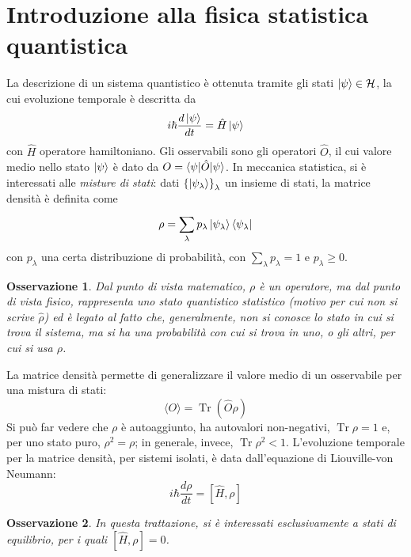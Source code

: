 \documentclass[11pt, a4paper]{scrartcl}
\theoremstyle{style}
\newtheorem{osservazione}{Osservazione}[section]
\theoremstyle{style1}
\numberwithin{equation}{subsection}
\begin{document}
\newpage

\section{Introduzione alla fisica statistica quantistica}
La descrizione di un sistema quantistico \`e ottenuta tramite gli stati $\ket{\psi } \in \mathcal{H} $, la cui evoluzione temporale \`e descritta da 
\[
i \hbar \frac{ d\ket{\psi } }{d t} = \hat{H} \ket{\psi } 
\] 
con $\hat{H}$ operatore hamiltoniano.
Gli osservabili sono gli operatori $\hat{O}$, il cui valore medio nello stato $\ket{\psi } $ \`e dato da $O = \braket{\psi |\hat{O}|\psi } $.
In meccanica statistica, si \`e interessati alle \textit{misture di stati}: dati $\left\{ \ket{\psi _\lambda }  \right\} _\lambda $ un insieme di stati, la matrice densit\`a \`e definita come
\[
\rho  = \sum_{\lambda }^{} p_\lambda \ket{\psi _\lambda } \bra{\psi _\lambda }  
\] 
con $p_\lambda $ una certa distribuzione di probabilit\`a, con $\sum_{\lambda }^{} p_\lambda  = 1$ e $p_\lambda  \ge  0$.
\begin{osservazione}
Dal punto di vista matematico, $\rho $ \`e un operatore, ma dal punto di vista fisico, rappresenta uno stato quantistico statistico (motivo per cui non si scrive $\hat{\rho }$) ed \`e legato al fatto che, generalmente, non si conosce lo stato in cui si trova il sistema, ma si ha una probabilit\`a con cui si trova in uno, o gli altri, per cui si usa $\rho $.
\end{osservazione}
\noindent La matrice densit\`a permette di generalizzare il valore medio di un osservabile per una mistura di stati:
\[
\langle O \rangle = \operatorname{Tr}  (\hat{O}\rho)
\] 
Si pu\`o far vedere che $\rho $ \`e autoaggiunto, ha autovalori non-negativi, $\operatorname{Tr} \rho  =1$ e, per uno stato puro, $\rho ^2 = \rho $; in generale, invece, $\operatorname{Tr} \rho ^2 < 1$.
L'evoluzione temporale per la matrice densit\`a, per sistemi isolati, \`e data dall'equazione di Liouville-von Neumann:
\begin{equation}
	i\hbar  \frac{d \rho }{d t} = [\hat{H},\rho ]
\end{equation}
\begin{osservazione}
	In questa trattazione, si \`e interessati esclusivamente a stati di equilibrio, per i quali $ [\hat{H}, \rho] = 0$.
\end{osservazione}
\end{document}
